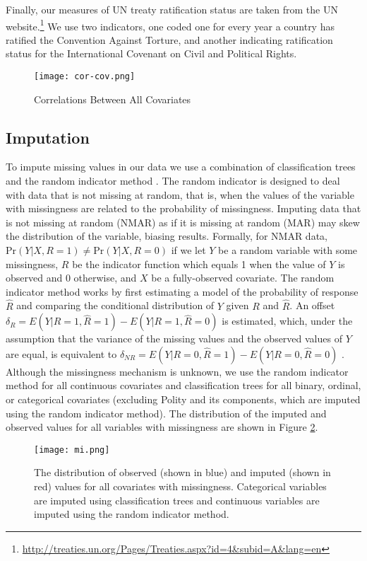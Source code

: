\documentclass[12pt]{article}
\begin{document}
Finally, our measures of UN treaty ratification status are taken from the UN website.\footnote{\url{http://treaties.un.org/Pages/Treaties.aspx?id=4&subid=A&lang=en}} We use two indicators, one coded one for every year a country has ratified the Convention Against Torture, and another indicating ratification status for the International Covenant on Civil and Political Rights. 

\begin{figure}[!htpb]
\texttt{[image: cor-cov.png]}
\caption{Correlations Between All Covariates} 
\label{fig:cor-cov}
\end{figure}

\subsection{Imputation}

To impute missing values in our data we use a combination of classification trees and the random indicator method \citep{buuren2011mice,jolani2012}. The random indicator is designed to deal with data that is not missing at random, that is, when the values of the variable with missingness are related to the probability of missingness. Imputing data that is not missing at random (NMAR) as if it is missing at random (MAR) may skew the distribution of the variable, biasing results. Formally, for NMAR data, $\text{Pr}(Y|X, R=1) \neq \text{Pr}(Y|X, R=0)$ if we let $Y$ be a random variable with some missingness, $R$ be the indicator function which equals 1 when the value of $Y$ is observed and 0 otherwise, and $X$ be a fully-observed covariate. The random indicator method works by first estimating a model of the probability of response $\hat{R}$ and comparing the conditional distribution of $Y$ given $R$ and $\hat{R}$. An offset $\delta_R = E(Y|R=1,\hat{R}=1) - E(Y|R=1,\hat{R}=0)$ is estimated, which, under the assumption that the variance of the missing values and the observed values of $Y$ are equal, is equivalent to $\delta_{NR} = E(Y|R=0,\hat{R}=1) - E(Y|R=0,\hat{R}=0)$ \citep{jolani2012}. Although the missingness mechanism is unknown, we use the random indicator method for all continuous covariates and classification trees for all binary, ordinal, or categorical covariates (excluding Polity and its components, which are imputed using the random indicator method). The distribution of the imputed and observed values for all variables with missingness are shown in Figure \ref{fig:mi}.

\begin{figure}[!htpb]
\centering
\texttt{[image: mi.png]}
\caption{The distribution of observed (shown in blue) and imputed (shown in red) values for all covariates with missingness. Categorical variables are imputed using classification trees and continuous variables are imputed using the random indicator method.}
\label{fig:mi}
\end{figure}
\end{document}
